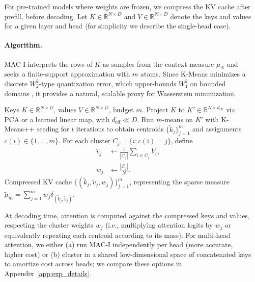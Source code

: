 \documentclass{article}
\theoremstyle{plain}
\theoremstyle{definition}
\theoremstyle{remark}
\newcommand{\R}{\mathbb{R}}
\newcommand{\muN}{\mu_N} %
\newcommand{\Wass}[1]{W_{#1}} %
\begin{document}
For pre-trained models where weights are frozen, we compress the KV cache after prefill,
before decoding. Let $K \in \R^{N \times D}$ and $V \in \R^{N \times D}$ denote the keys
and values for a given layer and head (for simplicity we describe the single-head case).

\paragraph{Algorithm.}
MAC-I interprets the rows of $K$ as samples from the context measure $\muN$ and seeks a
finite-support approximation with $m$ atoms. Since K-Means minimizes a discrete
$\Wass{2}^2$-type quantization error, which upper-bounds $\Wass{1}^2$ on bounded domains
\citep{villani2009optimal,graf2000foundations}, it provides a natural, scalable proxy for
Wasserstein minimization.

\begin{algorithm}[h]
   \caption{MAC-I: Inference-Time KV Compression}
   \label{alg:mac_i}
\begin{algorithmic}[1]
    Keys $K \in \R^{N \times D}$, values $V \in \R^{N \times D}$,
   budget $m$.
    Project $K$ to
   $K' \in \R^{N \times d_{\text{eff}}}$ via PCA or a learned linear map, with
   $d_{\text{eff}} \ll D$.
    Run $m$-means on $K'$ with K-Means++ seeding
   \citep{arthur2007k} for $t$ iterations to obtain centroids
   $\{\tilde{k}_j\}_{j=1}^m$ and assignments $c(i) \in \{1,\dots,m\}$.
    For each cluster $C_j = \{i : c(i) = j\}$, define
   \begin{align*}
       \tilde{v}_j &\leftarrow \frac{1}{|C_j|} \sum_{i \in C_j} V_i, \\
       w_j &\leftarrow \frac{|C_j|}{N}.
   \end{align*}
    Compressed KV cache
   $\{(\tilde{k}_j, \tilde{v}_j, w_j)\}_{j=1}^m$, representing the sparse measure
   $\tilde\mu_m = \sum_{j=1}^m w_j \delta_{(\tilde{k}_j,\tilde{v}_j)}$.
\end{algorithmic}
\end{algorithm}

At decoding time, attention is computed against the compressed keys and values,
respecting the cluster weights $w_j$ (i.e., multiplying attention logits by $w_j$ or
equivalently repeating each centroid according to its mass). For multi-head attention,
we either (a) run MAC-I independently per head (more accurate, higher cost) or
(b) cluster in a shared low-dimensional space of concatenated keys to amortize cost
across heads; we compare these options in Appendix~\ref{app:exp_details}.
\end{document}
